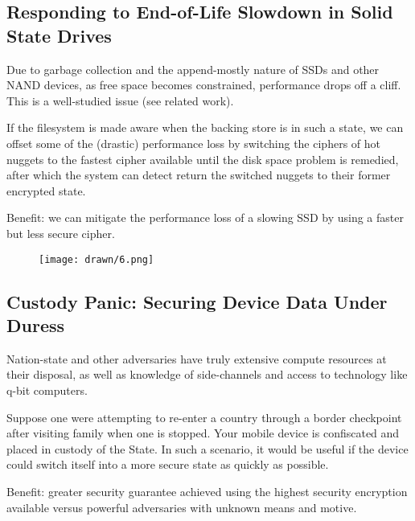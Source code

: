 \subsection{Responding to End-of-Life Slowdown in Solid State Drives}

Due to garbage collection and the append-mostly nature of SSDs and other NAND
devices, as free space becomes constrained, performance drops off a cliff. This
is a well-studied issue (see related work).

If the filesystem is made aware when the backing store is in such a state, we
can offset some of the (drastic) performance loss by switching the ciphers of hot
nuggets to the fastest cipher available until the disk space problem is
remedied, after which the system can detect return the switched nuggets to their
former encrypted state.

Benefit: we can mitigate the performance loss of a slowing SSD by using a faster
but less secure cipher.

\begin{figure}[ht]
 \centering
  \texttt{[image: drawn/6.png]}
   \caption{}\label{fig:eol}
\end{figure}

\subsection{Custody Panic: Securing Device Data Under Duress}

Nation-state and other adversaries have truly extensive compute resources at
their disposal, as well as knowledge of side-channels and access to technology
like q-bit computers.

Suppose one were attempting to re-enter a country through a border checkpoint
after visiting family when one is stopped. Your mobile device is confiscated and
placed in custody of the State. In such a scenario, it would be useful if the
device could switch itself into a more secure state as quickly as possible.

Benefit: greater security guarantee achieved using the highest security
encryption available versus powerful adversaries with unknown means and motive.



